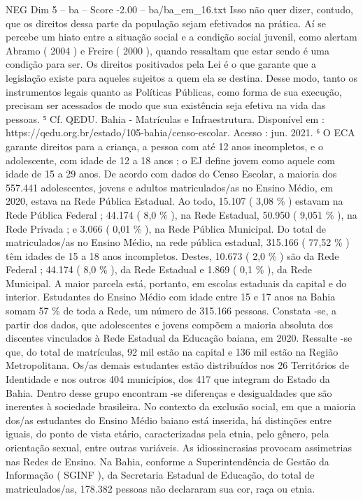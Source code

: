 \begin{textsample}{NEG Dim 5 – ba – Score -2.00 – ba/ba\_em\_16.txt}
Isso não quer dizer, contudo, que os direitos dessa parte da população sejam efetivados na prática.
Aí se percebe um hiato entre a situação social e a condição social juvenil, como alertam Abramo ( 2004 ) e Freire ( 2000 ), quando ressaltam que estar sendo é uma condição para ser.
Os direitos positivados pela Lei é o que garante que a legislação existe para aqueles sujeitos a quem ela se destina.
Desse modo, tanto os instrumentos legais quanto as Políticas Públicas, como forma de sua execução, precisam ser acessados de modo que sua existência seja efetiva na vida das pessoas. ⁵ Cf.
QEDU.
Bahia - Matrículas e Infraestrutura.
Disponível em : https://qedu.org.br/estado/105-bahia/censo-escolar.
Acesso : jun. 2021. ⁶ O ECA garante direitos para a criança, a pessoa com até 12 anos incompletos, e o adolescente, com idade de 12 a 18 anos ; o EJ define jovem como aquele com idade de 15 a 29 anos.
De acordo com dados do Censo Escolar, a maioria dos 557.441 adolescentes, jovens e adultos matriculados/as no Ensino Médio, em 2020, estava na Rede Pública Estadual.
Ao todo, 15.107 ( 3,08 \% ) estavam na Rede Pública Federal ; 44.174 ( 8,0 \% ), na Rede Estadual, 50.950 ( 9,051 \% ), na Rede Privada ; e 3.066 ( 0,01 \% ), na Rede Pública Municipal.
Do total de matriculados/as no Ensino Médio, na rede pública estadual, 315.166 ( 77,52 \% ) têm idades de 15 a 18 anos incompletos.
Destes, 10.673 ( 2,0 \% ) são da Rede Federal ; 44.174 ( 8,0 \% ), da Rede Estadual e 1.869 ( 0,1 \% ), da Rede Municipal.
A maior parcela está, portanto, em escolas estaduais da capital e do interior.
Estudantes do Ensino Médio com idade entre 15 e 17 anos na Bahia somam 57 \% de toda a Rede, um número de 315.166 pessoas.
Constata -se, a partir dos dados, que adolescentes e jovens compõem a maioria absoluta dos discentes vinculados à Rede Estadual da Educação baiana, em 2020.
Ressalte -se que, do total de matrículas, 92 mil estão na capital e 136 mil estão na Região Metropolitana.
Os/as demais estudantes estão distribuídos nos 26 Territórios de Identidade e nos outros 404 municípios, dos 417 que integram do Estado da Bahia.
Dentro desse grupo encontram -se diferenças e desigualdades que são inerentes à sociedade brasileira.
No contexto da exclusão social, em que a maioria dos/as estudantes do Ensino Médio baiano está inserida, há distinções entre iguais, do ponto de vista etário, caracterizadas pela etnia, pelo gênero, pela orientação sexual, entre outras variáveis.
As idiossincrasias provocam assimetrias nas Redes de Ensino.
Na Bahia, conforme a Superintendência de Gestão da Informação ( SGINF ), da Secretaria Estadual de Educação, do total de matriculados/as, 178.382 pessoas não declararam sua cor, raça ou etnia.

\end{textsample}
